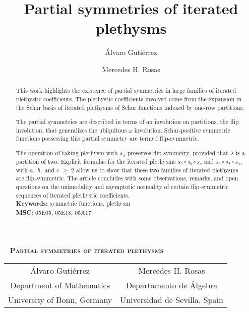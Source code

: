 \documentclass[twoside]{article}
\title{Partial symmetries of iterated plethysms}
\author{Álvaro Gutiérrez \and Mercedes H. Rosas}
\begin{document}
\thispagestyle{alim}
\begin{center}\large {\ }
\vspace{1em}
\textbf{\scshape\Large Partial symmetries of iterated plethysms}
\\ \vspace{2em}
\renewcommand{\thefootnote}{\fnsymbol{footnote}}
\renewcommand{\arraystretch}{1}
\setlength{\tabcolsep}{2em}
\begin{tabular}{cc}
    \'Alvaro Gutiérrez\footnotemark[1]{}
    & Mercedes H. Rosas\footnotemark[2]{} \\
    {\small Department of Mathematics} & {\small Departamento de Álgebra}\\
    {\small University of Bonn, Germany} & {\small Universidad de Sevilla, Spain}
\end{tabular}
\renewcommand{\thefootnote}{\arabic{footnote}}
\setcounter{footnote}{0}
\\ \vspace{2em}
\end{center}

\begin{abstract}This work highlights the existence of  partial symmetries  in large families of iterated plethystic coefficients. The plethystic coefficients involved  come from the  expansion in the Schur basis of   iterated plethysms of Schur functions indexed by  one-row partitions.


The partial symmetries are described in terms of  an involution on partitions, the flip involution, that generalizes  the ubiquitous $\omega$ involution. Schur-positive symmetric functions possessing this partial symmetry are termed flip-symmetric.

The operation of taking plethysm with $s_\lambda$ preserves  flip-symmetry, provided that $\lambda$ is a partition of two.
Explicit formulas for the iterated plethysms $s_2\circ s_b\circ s_a$ and $s_c\circ s_2\circ s_a$, with $a,$  $b,$ and $c$ $\ge$ $2$  allow us to show that these two families of iterated plethysms are flip-symmetric.
The article concludes with some observations, remarks, and open questions on the  unimodality and asymptotic normality of certain
flip-symmetric sequences of iterated plethystic coefficients.\\

\noindent\textbf{Keywords:} symmetric functions, plethysm\\
\textbf{MSC:} 05E05, 05E18, 05A17
\end{abstract}
\end{document}
